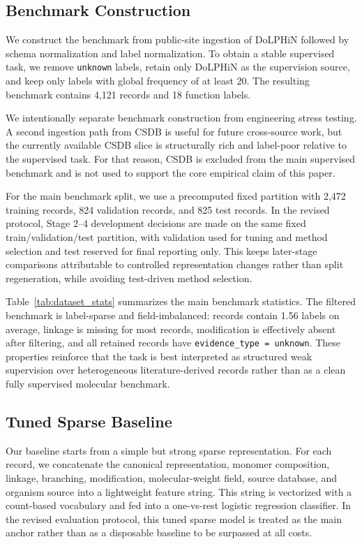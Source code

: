 \documentclass{article}
\begin{document}
\subsection{Benchmark Construction}
\label{sec:benchmark}

We construct the benchmark from public-site ingestion of DoLPHiN followed by schema normalization and label normalization. To obtain a stable supervised task, we remove \texttt{unknown} labels, retain only DoLPHiN as the supervision source, and keep only labels with global frequency of at least 20. The resulting benchmark contains 4,121 records and 18 function labels.

We intentionally separate benchmark construction from engineering stress testing. A second ingestion path from CSDB is useful for future cross-source work, but the currently available CSDB slice is structurally rich and label-poor relative to the supervised task. For that reason, CSDB is excluded from the main supervised benchmark and is not used to support the core empirical claim of this paper.

For the main benchmark split, we use a precomputed fixed partition with 2,472 training records, 824 validation records, and 825 test records. In the revised protocol, Stage 2--4 development decisions are made on the same fixed train/validation/test partition, with validation used for tuning and method selection and test reserved for final reporting only. This keeps later-stage comparisons attributable to controlled representation changes rather than split regeneration, while avoiding test-driven method selection.

Table~\ref{tab:dataset_stats} summarizes the main benchmark statistics. The filtered benchmark is label-sparse and field-imbalanced: records contain 1.56 labels on average, linkage is missing for most records, modification is effectively absent after filtering, and all retained records have \texttt{evidence\_type = unknown}. These properties reinforce that the task is best interpreted as structured weak supervision over heterogeneous literature-derived records rather than as a clean fully supervised molecular benchmark.

\subsection{Tuned Sparse Baseline}
\label{sec:baseline}

Our baseline starts from a simple but strong sparse representation. For each record, we concatenate the canonical representation, monomer composition, linkage, branching, modification, molecular-weight field, source database, and organism source into a lightweight feature string. This string is vectorized with a count-based vocabulary and fed into a one-vs-rest logistic regression classifier. In the revised evaluation protocol, this tuned sparse model is treated as the main anchor rather than as a disposable baseline to be surpassed at all costs.
\end{document}
